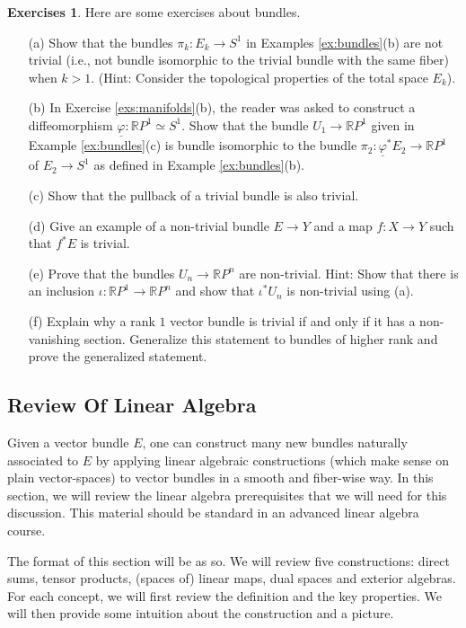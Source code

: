 \documentclass[12pt]{article}
\theoremstyle{definition}
\newtheorem{exercises}[theorem]{Exercises}
\numberwithin{equation}{section}
\newcommand{\R}{{\mathbb R}}
\begin{document}
\begin{exercises} \label{exs:bundles} Here are some exercises about bundles.
\begin{itemize}
	\item[(a)] Show that the bundles $\pi_k:E_k \to S^1$ in Examples \ref{ex:bundles}(b) are not trivial (i.e., not bundle isomorphic to the trivial bundle with the same fiber) when $k > 1$. (Hint: Consider the topological properties of the total space $E_k$).
	\item[(b)] In Exercise \ref{exs:manifolds}(b), the reader was asked to construct a diffeomorphism $\underline{\varphi}:\R P^1 \simeq S^1$. Show that the bundle $U_1 \to \R P^1$ given in Example \ref{ex:bundles}(c) is bundle isomorphic to the bundle $\pi_2:\underline{\varphi}^*E_2 \to \R P^1$ of $E_2 \to S^1$ as defined in Example \ref{ex:bundles}(b).
	\item[(c)] Show that the pullback of a trivial bundle is also trivial. 
	\item[(d)] Give an example of a non-trivial bundle $E \to Y$ and a map $f:X \to Y$ such that $f^*E$ is trivial.
	\item[(e)] Prove that the bundles $U_n \to \R P^n$ are non-trivial. Hint: Show that there is an inclusion $\iota:\R P^1 \to \R P^n$ and show that $\iota^*U_n$ is non-trivial using (a).
	\item[(f)] Explain why a rank $1$ vector bundle is trivial if and only if it has a non-vanishing section. Generalize this statement to bundles of higher rank and prove the generalized statement.
\end{itemize}
\end{exercises} 

\subsection{Review Of Linear Algebra} \label{subsec:review_of_linear_algebra} Given a vector bundle $E$, one can construct many new bundles naturally associated to $E$ by applying linear algebraic constructions (which make sense on plain vector-spaces) to vector bundles in a smooth and fiber-wise way. In this section, we will review the linear algebra prerequisites that we will need for this discussion. This material should be standard in an advanced linear algebra course.

The format of this section will be as so. We will review five constructions: direct sums, tensor products, (spaces of) linear maps, dual spaces and exterior algebras. For each concept, we will first review the definition and the key properties. We will then provide some intuition about the construction and a picture.
\end{document}
